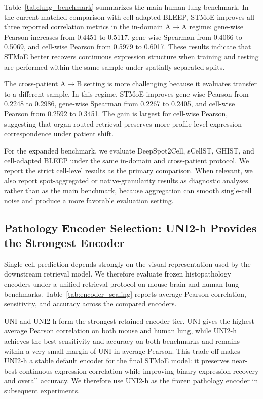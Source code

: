 \documentclass[sigconf]{acmart}
\newcommand{\method}{STMoE\xspace}
\begin{document}
Table~\ref{tab:lung_benchmark} summarizes the main human lung benchmark. In the current matched comparison with cell-adapted BLEEP, \method{} improves all three reported correlation metrics in the in-domain A$\rightarrow$A regime: gene-wise Pearson increases from 0.4451 to 0.5117, gene-wise Spearman from 0.4066 to 0.5069, and cell-wise Pearson from 0.5979 to 0.6017. These results indicate that \method{} better recovers continuous expression structure when training and testing are performed within the same sample under spatially separated splits.

The cross-patient A$\rightarrow$B setting is more challenging because it evaluates transfer to a different sample. In this regime, \method{} improves gene-wise Pearson from 0.2248 to 0.2986, gene-wise Spearman from 0.2267 to 0.2405, and cell-wise Pearson from 0.2592 to 0.3451. The gain is largest for cell-wise Pearson, suggesting that organ-routed retrieval preserves more profile-level expression correspondence under patient shift.

For the expanded benchmark, we evaluate DeepSpot2Cell, sCellST, GHIST, and cell-adapted BLEEP under the same in-domain and cross-patient protocol. We report the strict cell-level results as the primary comparison. When relevant, we also report spot-aggregated or native-granularity results as diagnostic analyses rather than as the main benchmark, because aggregation can smooth single-cell noise and produce a more favorable evaluation setting.



\subsection{Pathology Encoder Selection: UNI2-h Provides the Strongest Encoder}

Single-cell prediction depends strongly on the visual representation used by the downstream retrieval model. We therefore evaluate frozen histopathology encoders under a unified retrieval protocol on mouse brain and human lung benchmarks. Table~\ref{tab:encoder_scaling} reports average Pearson correlation, sensitivity, and accuracy across the compared encoders.

UNI and UNI2-h form the strongest retained encoder tier. UNI gives the highest average Pearson correlation on both mouse and human lung, while UNI2-h achieves the best sensitivity and accuracy on both benchmarks and remains within a very small margin of UNI in average Pearson. This trade-off makes UNI2-h a stable default encoder for the final \method{} model: it preserves near-best continuous-expression correlation while improving binary expression recovery and overall accuracy. We therefore use UNI2-h as the frozen pathology encoder in subsequent experiments.
\end{document}
